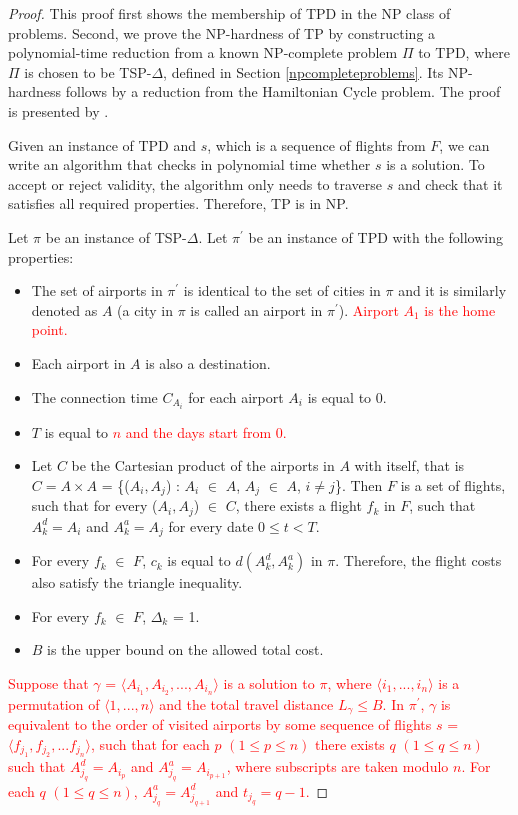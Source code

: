 \documentclass{mprop}
\theoremstyle{definition}
\begin{document}
\begin{proof}
\label{npcompleteproof}
This proof first shows the membership of TPD in the NP class of problems. Second, we prove the NP-hardness of TP by constructing a polynomial-time reduction from a known NP-complete problem $\Pi$ to TPD, where $\Pi$ is chosen to be TSP-$\Delta$, defined in Section \ref{npcompleteproblems}. Its NP-hardness follows by a reduction from the Hamiltonian Cycle problem. The proof is presented by \citet{thebible}.

Given an instance of TPD and $s$, which is a sequence of flights from $F$, we can write an algorithm that checks in polynomial time whether $s$ is a solution. To accept or reject validity, the algorithm only needs to traverse $s$ and check that it satisfies all required properties. Therefore, TP is in NP.

Let $\pi$ be an instance of TSP-$\Delta$. Let $\pi^{\prime}$ be an instance of TPD with the following properties:
\begin{itemize}
\item The set of airports in $\pi^{\prime}$ is identical to the set of cities in $\pi$ and it is similarly denoted as $A$ (a city in $\pi$ is called an airport in $\pi^{\prime}$). \textcolor{red}{Airport $A_{1}$ is the home point.}
\item Each airport in $A$ is also a destination.
\item The connection time $C_{A_{i}}$ for each airport $A_{i}$ is equal to 0.
\item $T$ is equal to \textcolor{red}{$n$ and the days start from 0.}
\item Let $C$ be the Cartesian product of the airports in $A$ with itself, that is $C = A \times A$ = \{($A_{i}, A_{j}$) : $A_{i}$ $\in$ $A$, $A_{j}$ $\in$ $A$, $i \neq j$\}. Then $F$ is a set of flights, such that for every ($A_{i}, A_{j}$) $\in$ $C$, there exists a flight $f_{k}$ in $F$, such that $A^{d}_{k} = A_{i}$ and $A^{a}_{k} = A_{j}$ for every date $0 \leq t < T$.
\item For every $f_{k}$ $\in$ $F$, $c_{k}$ is equal to $d(A^{d}_{k}, A^{a}_{k})$ in $\pi$. Therefore, the flight costs also satisfy the triangle inequality.
\item For every $f_{k}$ $\in$ $F$, $\Delta_{k}$ = 1.
\item $B$ is the upper bound on the allowed total cost.
\end{itemize}

\textcolor{red}{
Suppose that $\gamma$ = $ \langle A_{i_{1}}, A_{i_{2}},...,A_{i_{n}} \rangle $ is a solution to $\pi$, where $\langle i_{1},...,i_{n} \rangle$ is a permutation of $\langle 1,...,n \rangle $ and the total travel distance $L_{\gamma} \leq B$. In $\pi^{\prime}$, $\gamma$ is equivalent to the order of visited airports by some sequence of flights $s$ = $ \langle f_{j_{1}}, f_{j_{2}},...f_{j_{n}} \rangle $, such that for each $p$  $(1 \leq p \leq n)$ there exists $q$ $(1 \leq q \leq n)$ such that $A^{d}_{j_{q}} = A_{i_{p}}$ and $A^{a}_{j_{q}} = A_{i_{p+1}}$, where subscripts are taken modulo $n$. For each $q$ $(1 \leq q \leq n)$, $A^{a}_{j_{q}} = A^{d}_{j_{q+1}}$ and $t_{j_{q}} = q - 1$.}


\end{proof}
\end{document}
